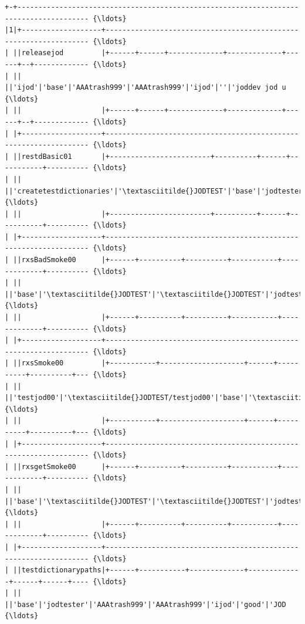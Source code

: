 \documentclass[11pt,letter,landscape]{article}
\begin{document}
    \begin{Verbatim}[commandchars=\\\{\}]
+-+--------------------------------------------------------------------------------------- {\ldots} 
|1|+-------------------+------------------------------------------------------------------ {\ldots} 
| ||releasejod         |+------+------+-------------+-------------+------+--+------------- {\ldots} 
| ||                   ||'ijod'|'base'|'AAAtrash999'|'AAAtrash999'|'ijod'|''|'joddev jod u {\ldots} 
| ||                   |+------+------+-------------+-------------+------+--+------------- {\ldots} 
| |+-------------------+------------------------------------------------------------------ {\ldots} 
| ||restdBasic01       |+------------------------+----------+------+-----------+---------- {\ldots} 
| ||                   ||'createtestdictionaries'|'\textasciitilde{}JODTEST'|'base'|'jodtester'|'\textasciitilde{}JODTEST' {\ldots} 
| ||                   |+------------------------+----------+------+-----------+---------- {\ldots} 
| |+-------------------+------------------------------------------------------------------ {\ldots} 
| ||rxsBadSmoke00      |+------+----------+----------+-----------+-------------+---------- {\ldots} 
| ||                   ||'base'|'\textasciitilde{}JODTEST'|'\textasciitilde{}JODTEST'|'jodtester'|'AAAsmoke999'|'AAAsmoke9 {\ldots} 
| ||                   |+------+----------+----------+-----------+-------------+---------- {\ldots} 
| |+-------------------+------------------------------------------------------------------ {\ldots} 
| ||rxsSmoke00         |+-----------+--------------------+------+----------+----------+--- {\ldots} 
| ||                   ||'testjod00'|'\textasciitilde{}JODTEST/testjod00'|'base'|'\textasciitilde{}JODTEST'|'\textasciitilde{}JODTEST'|'jo {\ldots} 
| ||                   |+-----------+--------------------+------+----------+----------+--- {\ldots} 
| |+-------------------+------------------------------------------------------------------ {\ldots} 
| ||rxsgetSmoke00      |+------+----------+----------+-----------+-------------+---------- {\ldots} 
| ||                   ||'base'|'\textasciitilde{}JODTEST'|'\textasciitilde{}JODTEST'|'jodtester'|'AAAtrash999'|'AAAtrash9 {\ldots} 
| ||                   |+------+----------+----------+-----------+-------------+---------- {\ldots} 
| |+-------------------+------------------------------------------------------------------ {\ldots} 
| ||testdictionarypaths|+------+-----------+-------------+-------------+------+------+---- {\ldots} 
| ||                   ||'base'|'jodtester'|'AAAtrash999'|'AAAtrash999'|'ijod'|'good'|'JOD {\ldots} 

\end{Verbatim}
\end{document}
